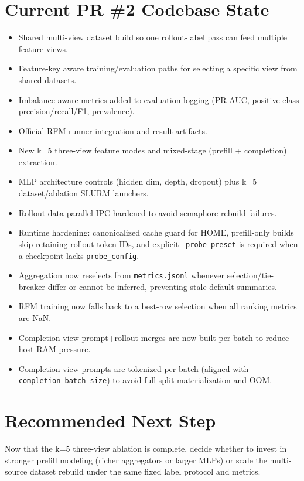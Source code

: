 \documentclass[11pt]{article}
\begin{document}
\section*{Current PR \#2 Codebase State}
\begin{itemize}
  \item Shared multi-view dataset build so one rollout-label pass can feed multiple feature views.
  \item Feature-key aware training/evaluation paths for selecting a specific view from shared datasets.
  \item Imbalance-aware metrics added to evaluation logging (PR-AUC, positive-class precision/recall/F1, prevalence).
  \item Official RFM runner integration and result artifacts.
  \item New k=5 three-view feature modes and mixed-stage (prefill + completion) extraction.
  \item MLP architecture controls (hidden dim, depth, dropout) plus k=5 dataset/ablation SLURM launchers.
  \item Rollout data-parallel IPC hardened to avoid semaphore rebuild failures.
  \item Runtime hardening: canonicalized cache guard for HOME, prefill-only builds skip retaining rollout token IDs, and explicit \texttt{--probe-preset} is required when a checkpoint lacks \texttt{probe\_config}.
  \item Aggregation now reselects from \texttt{metrics.jsonl} whenever selection/tie-breaker differ or cannot be inferred, preventing stale default summaries.
  \item RFM training now falls back to a best-row selection when all ranking metrics are NaN.
  \item Completion-view prompt+rollout merges are now built per batch to reduce host RAM pressure.
  \item Completion-view prompts are tokenized per batch (aligned with \texttt{--completion-batch-size}) to avoid full-split materialization and OOM.
\end{itemize}

\section*{Recommended Next Step}
Now that the k=5 three-view ablation is complete, decide whether to invest in stronger prefill modeling (richer aggregators or larger MLPs) or scale the multi-source dataset rebuild under the same fixed label protocol and metrics.
\end{document}
